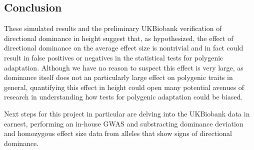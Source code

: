 \documentclass[a4paper,12pt]{article}
\begin{document}
\subsection*{Conclusion}
These simulated results and the preliminary UKBiobank verification of
directional dominance in height suggest that, as hypothesized, the
effect of directional dominance on the average effect size is
nontrivial and in fact could result in false positives or negatives in
the statistical tests for polygenic adaptation. Although we have no
reason to suspect this effect is very large, as dominance
itself does not an particularly large effect on polygenic traits in
general, quantifying this effect in height could open many potential
avenues of research in understanding how tests for polygenic
adaptation could be biased.

Next steps for this project in particular are delving into the
UKBiobank data in earnest, performing an in-house GWAS and
substracting dominance deviation and homozygous effect size data from
alleles that show signs of directional dominance. 


\pagebreak


\end{document}
